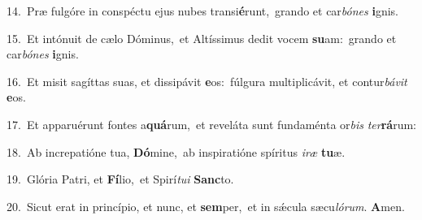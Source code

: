 {\numbfont\textcolor{\numbcolor}{14.}}~Præ fulgóre in conspéctu ejus nubes transi\-\textbf{é}\-runt,~\star grando et car\-\textit{bó}\-\textit{nes} \textbf{i}\-gnis.\par
{\numbfont\textcolor{\numbcolor}{15.}}~Et intónuit de cælo Dóminus,~\dagger et Altíssimus dedit vocem \textbf{su}\-am:~\star grando et car\-\textit{bó}\-\textit{nes} \textbf{i}\-gnis.\par
{\numbfont\textcolor{\numbcolor}{16.}}~Et misit sagíttas suas, et dissipávit \textbf{e}\-os:~\star fúlgura multiplicávit, et contur\-\textit{bá}\-\textit{vit} \textbf{e}\-os.\par
{\numbfont\textcolor{\numbcolor}{17.}}~Et apparuérunt fontes a\-\textbf{quá}\-rum,~\star et reveláta sunt fundaménta or\textit{bis} \textit{ter}\-\textbf{rá}rum:\par
{\numbfont\textcolor{\numbcolor}{18.}}~Ab increpatióne tua, \textbf{Dó}\-mine,~\star ab inspiratióne spíritus \textit{i}\-\textit{ræ} \textbf{tu}\-æ.\par
{\numbfont\textcolor{\numbcolor}{19.}}~Glória Patri, et \textbf{Fí}\-lio,~\star et Spirí\-\textit{tu}\-\textit{i} \textbf{Sanc}\-to.\par
{\numbfont\textcolor{\numbcolor}{20.}}~Sicut erat in princípio, et nunc, et \textbf{sem}\-per,~\star et in sǽcula sæcu\-\textit{ló}\-\textit{rum}. \textbf{A}\-men.\par
